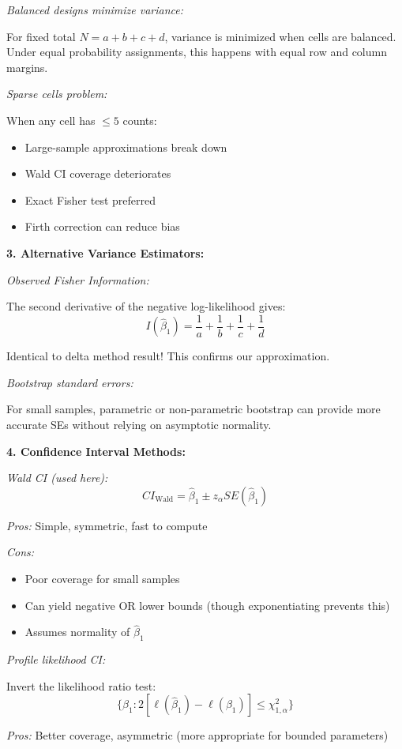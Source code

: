 \documentclass[12pt]{article}
\begin{document}
\begin{explanation}
\textit{Balanced designs minimize variance:}

For fixed total $N = a+b+c+d$, variance is minimized when cells are balanced. Under equal probability assignments, this happens with equal row and column margins.

\textit{Sparse cells problem:}

When any cell has $\leq 5$ counts:
\begin{itemize}
\item Large-sample approximations break down
\item Wald CI coverage deteriorates
\item Exact Fisher test preferred
\item Firth correction can reduce bias
\end{itemize}

\textbf{3. Alternative Variance Estimators:}

\textit{Observed Fisher Information:}

The second derivative of the negative log-likelihood gives:
\[
I(\hat{\beta}_1) = \frac{1}{a} + \frac{1}{b} + \frac{1}{c} + \frac{1}{d}
\]

Identical to delta method result! This confirms our approximation.

\textit{Bootstrap standard errors:}

For small samples, parametric or non-parametric bootstrap can provide more accurate SEs without relying on asymptotic normality.

\textbf{4. Confidence Interval Methods:}

\textit{Wald CI (used here):}
\[
CI_{\text{Wald}} = \hat{\beta}_1 \pm z_\alpha SE(\hat{\beta}_1)
\]

\textit{Pros:} Simple, symmetric, fast to compute

\textit{Cons:}
\begin{itemize}
\item Poor coverage for small samples
\item Can yield negative OR lower bounds (though exponentiating prevents this)
\item Assumes normality of $\hat{\beta}_1$
\end{itemize}

\textit{Profile likelihood CI:}

Invert the likelihood ratio test:
\[
\{\beta_1: 2[\ell(\hat{\beta}_1) - \ell(\beta_1)] \leq \chi^2_{1,\alpha}\}
\]

\textit{Pros:} Better coverage, asymmetric (more appropriate for bounded parameters)


\end{explanation}
\end{document}
